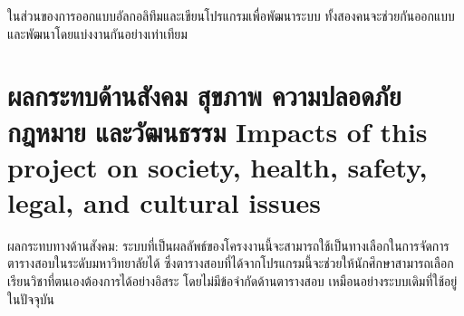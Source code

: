 ในส่วนของการออกแบบอัลกอลิทึมและเขียนโปรแกรมเพื่อพัฒนาระบบ ทั้งสองคนจะช่วยกันออกแบบและพัฒนาโดยแบ่งงานกันอย่างเท่าเทียม

\section{\ifcpe%
ผลกระทบด้านสังคม สุขภาพ ความปลอดภัย กฎหมาย และวัฒนธรรม
\else%
Impacts of this project on society, health, safety, legal, and cultural issues
\fi}

ผลกระทบทางด้านสังคม: ระบบที่เป็นผลลัพธ์ของโครงงานนี้จะสามารถใช้เป็นทางเลือกในการจัดการตารางสอบในระดับมหาวิทยาลัยได้
ซึ่งตารางสอบที่ได้จากโปรแกรมนี้จะช่วยให้นักศึกษาสามารถเลือกเรียนวิชาที่ตนเองต้องการได้อย่างอิสระ โดยไม่มีข้อจำกัดด้านตารางสอบ
เหมือนอย่างระบบเดิมที่ใช้อยู่ในปัจจุบัน